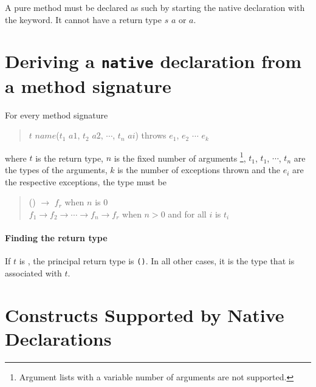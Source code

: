 A pure \java{} method must be declared as such by starting the native declaration with the  keyword. It cannot have a return type  $s$ $a$ or  $a$.

\section{Deriving a \frege{} \texttt{native} declaration from a \java{} method signature}

For every \java{} method signature

\begin{quote}
\begin{flushleft}
$t$ $name$($t_1$ $a1$, $t_2$ $a2$, $\cdots$, $t_n$ $ai$) throws $e_1$, $e_2$ $\cdots$ $e_k$
\end{flushleft}
\end{quote}

where $t$ is the return type, $n$ is the fixed number of arguments
\footnote{Argument lists with a variable number of arguments are not supported.},
$t_1$, $t_1$, $\cdots$, $t_n$  are the types of the arguments, 
$k$ is the number of exceptions thrown and the $e_i$ are the respective exceptions,
the \frege{} type must be

\begin{quote}
\begin{flushleft}
() $ \rightarrow{}$ $f_r$  when $n$ is 0\\
$f_1  \rightarrow{} f_2  \rightarrow{}\cdots \rightarrow{}  f_n  \rightarrow{} f_r$  when $n>0$ and for all $i$  is $t_i$\\
\end{flushleft}
\end{quote}

\paragraph{Finding the return type}

If $t$ is , the principal return type is \texttt{()}. 
In all other cases, it is the \frege{} type that is associated with $t$.


\section{\java{} Constructs Supported by Native Declarations}

